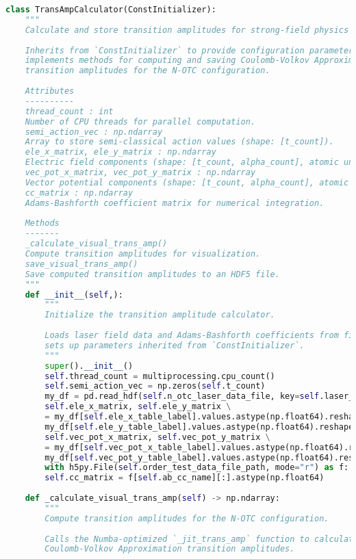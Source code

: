 \begin{lstlisting}[language=Python, caption={非正交激光跃迁振幅求解示范}, label={code:notc cva trans amp}]
class TransAmpCalculator(ConstInitializer):
	"""
	Calculate and store transition amplitudes for strong-field physics simulations.
	
	Inherits from `ConstInitializer` to provide configuration parameters and
	implements methods for computing and saving Coulomb-Volkov Approximation (CVA)
	transition amplitudes for the N-OTC configuration.
	
	Attributes
	----------
	thread_count : int
	Number of CPU threads for parallel computation.
	semi_action_vec : np.ndarray
	Array to store semi-classical action values (shape: [t_count]).
	ele_x_matrix, ele_y_matrix : np.ndarray
	Electric field components (shape: [t_count, alpha_count], atomic units).
	vec_pot_x_matrix, vec_pot_y_matrix : np.ndarray
	Vector potential components (shape: [t_count, alpha_count], atomic units).
	cc_matrix : np.ndarray
	Adams-Bashforth coefficient matrix for numerical integration.
	
	Methods
	-------
	_calculate_visual_trans_amp()
	Compute transition amplitudes for visualization.
	save_visual_trans_amp()
	Save computed transition amplitudes to an HDF5 file.
	"""
	def __init__(self,):
		"""
		Initialize the transition amplitude calculator.
		
		Loads laser field data and Adams-Bashforth coefficients from files and
		sets up parameters inherited from `ConstInitializer`.
		"""
		super().__init__()
		self.thread_count = multiprocessing.cpu_count()
		self.semi_action_vec = np.zeros(self.t_count)
		my_df = pd.read_hdf(self.n_otc_laser_data_file, key=self.laser_name)
		self.ele_x_matrix, self.ele_y_matrix \
		= my_df[self.ele_x_table_label].values.astype(np.float64).reshape(self.t_count, self.alpha_count), \
		my_df[self.ele_y_table_label].values.astype(np.float64).reshape(self.t_count, self.alpha_count)
		self.vec_pot_x_matrix, self.vec_pot_y_matrix \
		= my_df[self.vec_pot_x_table_label].values.astype(np.float64).reshape(self.t_count, self.alpha_count), \
		my_df[self.vec_pot_y_table_label].values.astype(np.float64).reshape(self.t_count, self.alpha_count)  # 显式转化为arr, 以便numba优化。
		with h5py.File(self.order_test_data_file_path, mode="r") as f:
		self.cc_matrix = f[self.ab_cc_name][:].astype(np.float64)
	
	def _calculate_visual_trans_amp(self) -> np.ndarray:
		"""
		Compute transition amplitudes for the N-OTC configuration.
		
		Calls the Numba-optimized `_jit_trans_amp` function to calculate the
		Coulomb-Volkov Approximation transition amplitudes.
		

\end{lstlisting}
